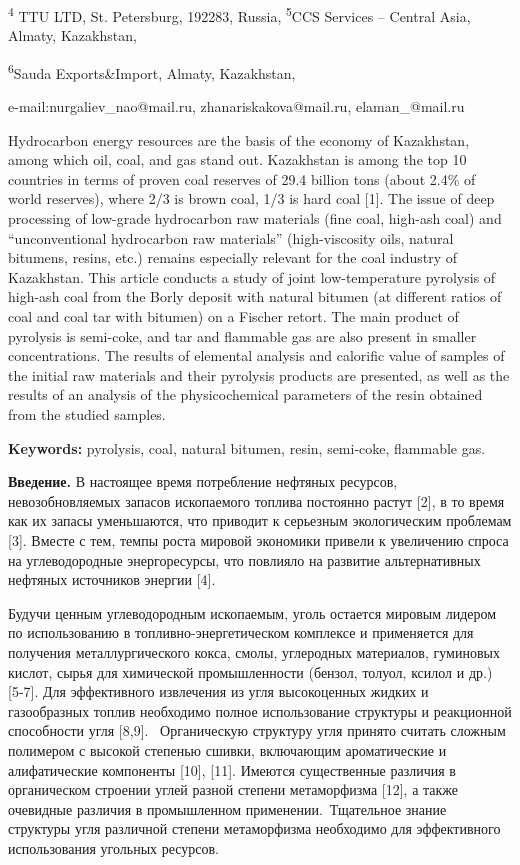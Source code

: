 \textsuperscript{4} TTU LTD, St. Petersburg, 192283, Russia,
\textsuperscript{5}CCS Services -- Central Asia, Almaty, Kazakhstan,

\textsuperscript{6}Sauda Exports\&Import, Almaty, Kazakhstan,

e-mail:nurgaliev\_nao@mail.ru, zhanariskakova@mail.ru, elaman\_@mail.ru

Hydrocarbon energy resources are the basis of the economy of Kazakhstan,
among which oil, coal, and gas stand out. Kazakhstan is among the top 10
countries in terms of proven coal reserves of 29.4 billion tons (about
2.4\% of world reserves), where 2/3 is brown coal, 1/3 is hard coal
{[}1{]}. The issue of deep processing of low-grade hydrocarbon raw
materials (fine coal, high-ash coal) and ``unconventional hydrocarbon
raw materials'' (high-viscosity oils, natural bitumens, resins, etc.)
remains especially relevant for the coal industry of Kazakhstan. This
article conducts a study of joint low-temperature pyrolysis of high-ash
coal from the Borly deposit with natural bitumen (at different ratios of
coal and coal tar with bitumen) on a Fischer retort. The main product of
pyrolysis is semi-coke, and tar and flammable gas are also present in
smaller concentrations. The results of elemental analysis and calorific
value of samples of the initial raw materials and their pyrolysis
products are presented, as well as the results of an analysis of the
physicochemical parameters of the resin obtained from the studied
samples.

\textbf{Keywords:} pyrolysis, coal, natural bitumen, resin, semi-coke,
flammable gas.

\textbf{Введение.} В настоящее время потребление нефтяных ресурсов,
невозобновляемых запасов ископаемого топлива постоянно растут {[}2{]}, в
то время как их запасы уменьшаются, что приводит к серьезным
экологическим проблемам {[}3{]}. Вместе с тем, темпы роста мировой
экономики привели к увеличению спроса на углеводородные энергоре­сурсы,
что повлияло на развитие альтернативных нефтяных источников энергии
{[}4{]}.

Будучи ценным углеводородным ископаемым, уголь остается мировым лидером
по использованию в топливно-энергетическом комплексе и применяется для
получения металлургического кокса, смолы, углеродных материалов,
гуминовых кислот, сырья для химической промышленности (бензол, толуол,
ксилол и др.) {[}5-7{]}. Для эффективного извлечения из угля
высокоценных жидких и газообразных топлив необходимо полное
использование структуры и реакционной способности угля {[}8,9{]}.~
Органическую структуру угля принято считать сложным полимером с высокой
степенью сшивки, включающим ароматические и алифатические компоненты
{[}10{]}, {[}11{]}. Имеются существенные различия в органическом
строении углей разной степени метаморфизма {[}12{]}, а также очевидные
различия в промышленном применении.~Тщательное знание структуры угля
различной степени метаморфизма необходимо для эффективного использования
угольных ресурсов.

